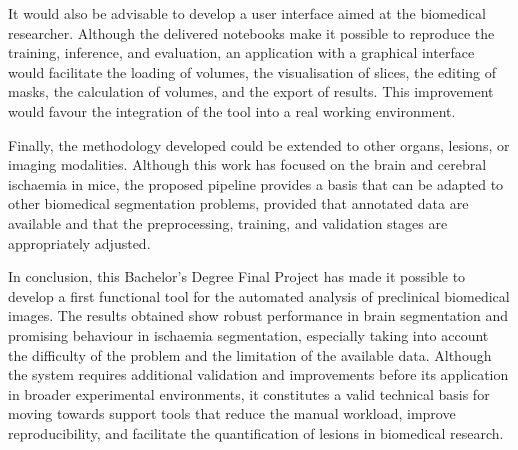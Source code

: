 It would also be advisable to develop a user interface aimed at the biomedical researcher. Although the delivered notebooks make it possible to reproduce the training, 
inference, and evaluation, an application with a graphical interface would facilitate the loading of volumes, the visualisation of slices, the editing of masks, the calculation of volumes, 
and the export of results. This improvement would favour the integration of the tool into a real working environment.

Finally, the methodology developed could be extended to other organs, lesions, or imaging modalities. Although this work has focused on the brain and cerebral ischaemia 
in mice, the proposed pipeline provides a basis that can be adapted to other biomedical segmentation problems, provided that annotated data are available and that 
the preprocessing, training, and validation stages are appropriately adjusted.

In conclusion, this Bachelor's Degree Final Project has made it possible to develop a first functional tool for the automated analysis of preclinical biomedical images.
The results obtained show robust performance in brain segmentation and promising behaviour in ischaemia segmentation, especially taking into 
account the difficulty of the problem and the limitation of the available data. Although the system requires additional validation and improvements before its application in broader 
experimental environments, it constitutes a valid technical basis for moving towards support tools that reduce the manual workload, improve reproducibility, and facilitate the quantification of 
lesions in biomedical research.
